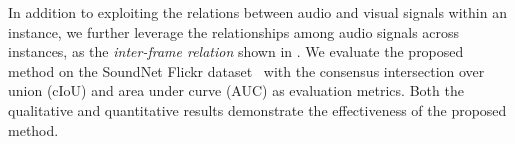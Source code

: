 %
%
In addition to exploiting the relations between audio and visual signals within an instance, we further leverage the relationships among audio signals across instances, as the \emph{inter-frame relation} shown in .
%
%
We evaluate the proposed method on the SoundNet Flickr dataset~\cite{av_cvpr18_lls,av_tpami20_lls} with the consensus intersection over union (cIoU) and area under curve (AUC) as evaluation metrics.%
%
Both the qualitative and quantitative results demonstrate the effectiveness of the proposed method. 

